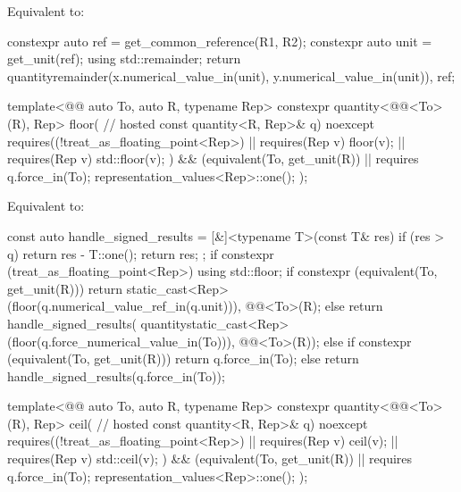 \begin{itemdescr}
\pnum
\effects
Equivalent to:
\begin{codeblock}
constexpr auto ref = get_common_reference(R1, R2);
constexpr auto unit = get_unit(ref);
using std::remainder;
return quantity{remainder(x.numerical_value_in(unit), y.numerical_value_in(unit)), ref};
\end{codeblock}
\end{itemdescr}

\begin{itemdecl}
template<@@ auto To, auto R, typename Rep>
constexpr quantity<@@<To>(R), Rep> floor(                             // hosted
  const quantity<R, Rep>& q) noexcept
  requires((!treat_as_floating_point<Rep>) || requires(Rep v) { floor(v); } ||
           requires(Rep v) { std::floor(v); }) &&
            (equivalent(To, get_unit(R)) || requires {
              q.force_in(To);
              representation_values<Rep>::one();
            });
\end{itemdecl}

\begin{itemdescr}
\pnum
\effects
Equivalent to:
\begin{codeblock}
const auto handle_signed_results = [&]<typename T>(const T& res) {
  if (res > q) {
    return res - T::one();
  }
  return res;
};
if constexpr (treat_as_floating_point<Rep>) {
  using std::floor;
  if constexpr (equivalent(To, get_unit(R))) {
    return {static_cast<Rep>(floor(q.numerical_value_ref_in(q.unit))),
            @@<To>(R)};
  } else {
    return handle_signed_results(
      quantity{static_cast<Rep>(floor(q.force_numerical_value_in(To))),
               @@<To>(R)});
  }
} else {
  if constexpr (equivalent(To, get_unit(R))) {
    return q.force_in(To);
  } else {
    return handle_signed_results(q.force_in(To));
  }
}
\end{codeblock}
\end{itemdescr}

\begin{itemdecl}
template<@@ auto To, auto R, typename Rep>
constexpr quantity<@@<To>(R), Rep> ceil(                              // hosted
  const quantity<R, Rep>& q) noexcept
  requires((!treat_as_floating_point<Rep>) || requires(Rep v) { ceil(v); } ||
           requires(Rep v) { std::ceil(v); }) &&
            (equivalent(To, get_unit(R)) || requires {
              q.force_in(To);
              representation_values<Rep>::one();
            });
\end{itemdecl}

